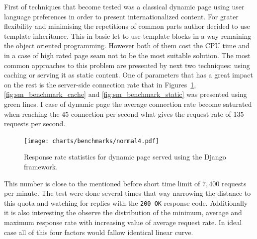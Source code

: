 First of techniques that become tested was a classical dynamic page using user language preferences in order to present internationalized content. For grater flexibility and minimising the repetitions of common parts author decided to use template inheritance. This in basic let to use template blocks in a way remaining the object oriented  programming. However both of them cost the CPU time and in a case of high rated page seam not to be the most suitable solution. The most common approaches to this problem are presented by next two techniques: using caching or serving it as static content. One of parameters that has a great impact on the rest is the server-side connection rate that in Figures~\ref{fig:sm_benchmark_normal}, \ref{fig:sm_benchmark_cache} and \ref{fig:sm_benchmark_static} was presented using green lines. I case of dynamic page the average connection rate become saturated when reaching the 45 connection per second what gives the request rate of 135 requests per second. 
\begin{figure}[ht]
  \begin{center}
	\texttt{[image: charts/benchmarks/normal4.pdf]}
  \end{center}
  \caption{Response rate statistics for dynamic page served using the Django framework.}
	\label{fig:sm_benchmark_normal}
\end{figure}
This number is close to the mentioned before short time limit of $7, 400$ requests per minute. The test were done several times that way narrowing the distance to this quota and watching for replies with the \texttt{200 OK} response code. Additionally it is also interesting the observe the distribution of the minimum, average and maximum response rate with increasing value of average request rate. In ideal case all of this four factors would fallow identical linear curve.     

